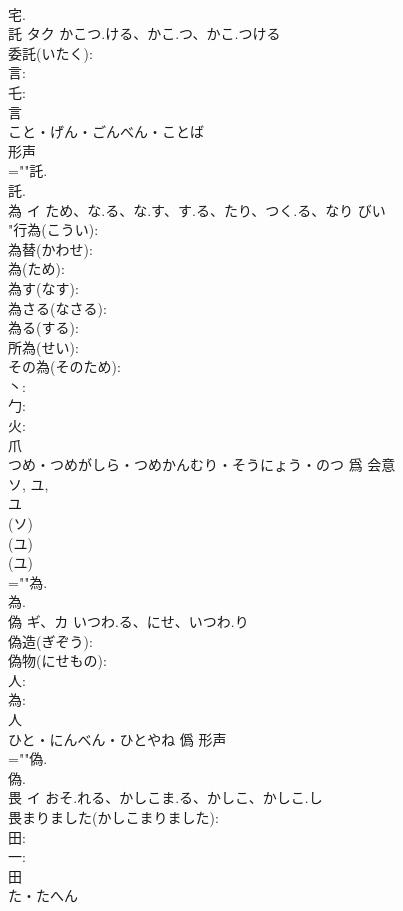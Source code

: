 \documentclass[8pt]{extreport}
\begin{document}
\begin{CJK}{UTF8}{min}
\\	宅.
\\	託	タク	かこつ.ける、かこ.つ、かこ.つける		
\\	委託(いたく): 
\\	言: 
\\	乇: 
\\	言	
\\	こと・げん・ごんべん・ことば	
\\	形声 
\\	=""託.
\\	託.
\\	為	イ	ため、な.る、な.す、す.る、たり、つく.る、なり	びい	
\\	"行為(こうい): 
\\	為替(かわせ): 
\\	為(ため): 
\\	為す(なす): 
\\	為さる(なさる): 
\\	為る(する): 
\\	所為(せい): 
\\	その為(そのため): 
\\	丶: 
\\	勹: 
\\	火: 
\\	爪	
\\	つめ・つめがしら・つめかんむり・そうにょう・のつ	爲	会意 
\\	ソ, ユ, 
\\	ユ 
\\	(ソ) 
\\	(ユ) 
\\	(ユ) 
\\	=""為.
\\	為.
\\	偽	ギ、カ	いつわ.る、にせ、いつわ.り		
\\	偽造(ぎぞう): 
\\	偽物(にせもの): 
\\	人: 
\\	為: 
\\	人	
\\	ひと・にんべん・ひとやね	僞	形声 
\\	=""偽.
\\	偽.
\\	畏	イ	おそ.れる、かしこま.る、かしこ、かしこ.し		
\\	畏まりました(かしこまりました): 
\\	田: 
\\	一: 
\\	田	
\\	た・たへん	

\end{CJK}
\end{document}
